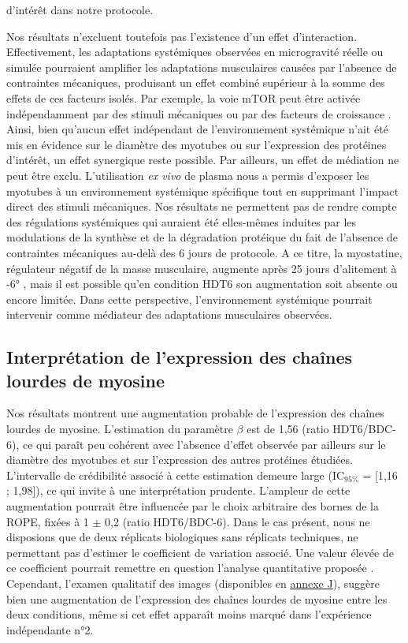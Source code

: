 \documentclass[11pt]{report}
\begin{document}
d'intérêt dans notre protocole.

Nos résultats n'excluent toutefois pas l'existence d'un effet d'interaction. Effectivement, les adaptations systémiques observées en microgravité réelle ou simulée pourraient amplifier les adaptations musculaires causées par l'absence de contraintes mécaniques, produisant un effet combiné supérieur à la somme des effets de ces facteurs isolés. Par exemple, la voie mTOR peut être activée indépendamment par des stimuli mécaniques ou par des facteurs de croissance \parencite{Hornberger2004Jun,Jacobs2013Oct}. Ainsi, bien qu'aucun effet indépendant de l'environnement systémique n'ait été mis en évidence sur le diamètre des myotubes ou sur l'expression des protéines d'intérêt, un effet synergique reste possible. Par ailleurs, un effet de médiation ne peut être exclu. L'utilisation \textit{ex vivo} de plasma nous a permis d'exposer les myotubes à un environnement systémique spécifique tout en supprimant l'impact direct des stimuli mécaniques. Nos résultats ne permettent pas de rendre compte des régulations systémiques qui auraient été elles-mêmes induites par les modulations de la synthèse et de la dégradation protéique du fait de l'absence de contraintes mécaniques au-delà des 6 jours de protocole. A ce titre, la myostatine, régulateur négatif de la masse musculaire, augmente après 25 jours d'alitement à -6° \parencite{Zachwieja1999Oct}, mais il est possible qu'en condition HDT6 son augmentation soit absente ou encore limitée. Dans cette perspective, l'environnement systémique pourrait intervenir comme médiateur des adaptations musculaires observées.

\subsection{Interprétation de l'expression des chaînes lourdes de myosine}

Nos résultats montrent une augmentation probable de l'expression des chaînes lourdes de myosine. L'estimation du paramètre $\beta$ est de 1,56 (ratio HDT6/BDC-6), ce qui paraît peu cohérent avec l'absence d'effet observée par ailleurs sur le diamètre des myotubes et sur l'expression des autres protéines étudiées. L'intervalle de crédibilité associé à cette estimation demeure large (IC$_{95\%}$ = [1,16 ; 1,98]), ce qui invite à une interprétation prudente. L'ampleur de cette augmentation pourrait être influencée par le choix arbitraire des bornes de la ROPE, fixées à 1 $\pm$ 0,2 (ratio HDT6/BDC-6). Dans le cas présent, nous ne disposions que de deux réplicats biologiques sans réplicats techniques, ne permettant pas d'estimer le coefficient de variation associé. Une valeur élevée de ce coefficient pourrait remettre en question l'analyse quantitative proposée \parencite{BibEntry2026Apr}. Cependant, l'examen qualitatif des images (disponibles en \hyperref[annexeJ]{annexe J}), suggère bien une augmentation de l'expression des chaînes lourdes de myosine entre les deux conditions, même si cet effet apparaît moins marqué dans l'expérience indépendante n°2. 
\end{document}
